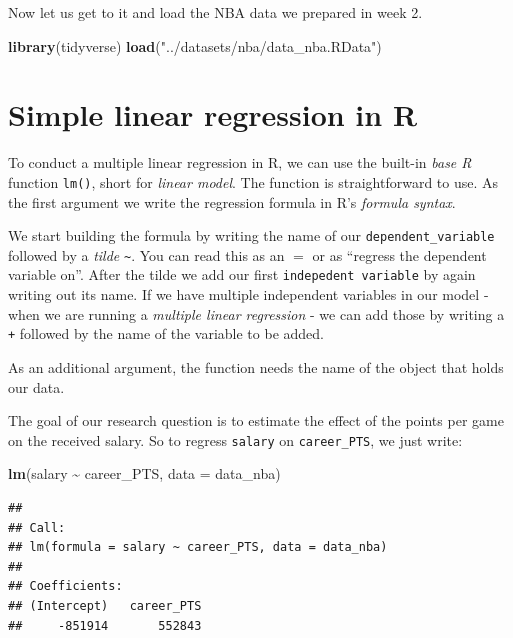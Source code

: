 \documentclass[
]{book}
\newenvironment{Shaded}{\begin{snugshade}}{\end{snugshade}}
\newcommand{\AttributeTok}[1]{\textcolor[rgb]{0.13,0.29,0.53}{#1}}
\newcommand{\FunctionTok}[1]{\textcolor[rgb]{0.13,0.29,0.53}{\textbf{#1}}}
\newcommand{\NormalTok}[1]{#1}
\newcommand{\SpecialCharTok}[1]{\textcolor[rgb]{0.81,0.36,0.00}{\textbf{#1}}}
\newcommand{\StringTok}[1]{\textcolor[rgb]{0.31,0.60,0.02}{#1}}
\begin{document}
Now let us get to it and load the NBA data we prepared in week 2.

\begin{Shaded}
\begin{Highlighting}[]
\FunctionTok{library}\NormalTok{(tidyverse)}
\FunctionTok{load}\NormalTok{(}\StringTok{"../datasets/nba/data\_nba.RData"}\NormalTok{)}
\end{Highlighting}
\end{Shaded}

\hypertarget{simple-linear-regression-in-r}{%
\section{Simple linear regression in R}\label{simple-linear-regression-in-r}}

To conduct a multiple linear regression in R, we can use the built-in
\emph{base R} function \texttt{lm()}, short for \emph{linear model}. The function is
straightforward to use. As the first argument we write the regression
formula in R's \emph{formula syntax}.

We start building the formula by writing the name of our
\texttt{dependent\_variable} followed by a \emph{tilde} \texttt{\textasciitilde{}}. You can read this as an
\(=\) or as ``regress the dependent variable on''. After the tilde we add
our first \texttt{indepedent\ variable} by again writing out its name. If we
have multiple independent variables in our model - when we are running a
\emph{multiple linear regression} - we can add those by writing a \texttt{+}
followed by the name of the variable to be added.

As an additional argument, the function needs the name of the object
that holds our data.

The goal of our research question is to estimate the effect of the
points per game on the received salary. So to regress \texttt{salary} on
\texttt{career\_PTS}, we just write:

\begin{Shaded}
\begin{Highlighting}[]
\FunctionTok{lm}\NormalTok{(salary }\SpecialCharTok{\textasciitilde{}}\NormalTok{ career\_PTS, }\AttributeTok{data =}\NormalTok{ data\_nba)}
\end{Highlighting}
\end{Shaded}

\begin{verbatim}
## 
## Call:
## lm(formula = salary ~ career_PTS, data = data_nba)
## 
## Coefficients:
## (Intercept)   career_PTS  
##     -851914       552843
\end{verbatim}
\end{document}
